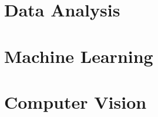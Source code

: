 \documentclass[10pt,landscape,a4paper]{article}
\begin{document}
    \section{Data Analysis}
        \begin{multicols}{3}
            
        \end{multicols} 
    \newpage


    \section{Machine Learning}
        \begin{multicols}{3}
            
        \end{multicols} 
    \newpage



    \section{Computer Vision}
        \begin{multicols}{3}
            
        \end{multicols} 
    \newpage
\end{document}
